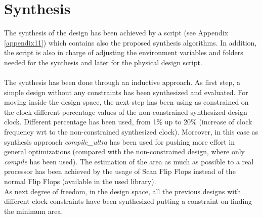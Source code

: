 \chapter{Synthesis}
\label{Synthesis}
The synthesis of the design has been achieved by a script (see Appendix \ref{appendix11}) which contains also the proposed synthesis algorithms. In addition, the script is also in charge of adjusting the environment variables and folders needed for the synthesis and later for the physical design script.\\\\
The synthesis has been done through an inductive approach. As first step, a simple design without any constraints has been synthesized and evaluated. For moving inside the design space, the next step has been using as constrained on the clock different percentage values of the non-constrained synthesized design clock. Different percentage has been used, from 1\% up to 20\% (increase of clock frequency wrt to the non-constrained synthesized clock). Moreover, in this case as synthesis approach \textit{compile\_ultra} has been used for pushing more effort in general optimizations (compared with the non-constrained design, where only \textit{compile} has been used). The estimation of the area as much as possible to a real processor has been achieved by the usage of Scan Flip Flops instead of the normal Flip Flops (available in the used library).\\
As next degree of freedom, in the design space, all the previous designs with different clock constraints have been synthesized putting a constraint on finding the minimum area.

